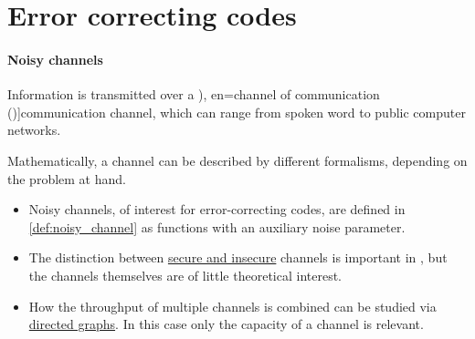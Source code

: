 \section{Error correcting codes}\label{sec:error_correcting_codes}

\paragraph{Noisy channels}

\begin{concept}\label{con:communication_channel}
  Information is transmitted over a \term[ru=канал связи (\cite[258]{Яблонский2003ДискретнаяМатематика}), en=channel of communication (\cite[879]{GowersEtAl2008PrincetonCompanion})]{communication channel}, which can range from spoken word to public computer networks.
\end{concept}
\begin{comments}
  \item Mathematically, a channel can be described by different formalisms, depending on the problem at hand.
  \begin{itemize}
    \item Noisy channels, of interest for error-correcting codes, are defined in \cref{def:noisy_channel} as functions with an auxiliary noise parameter.

    \item The distinction between \hyperref[con:privacy]{secure and insecure} channels is important in , but the channels themselves are of little theoretical interest.

    \item How the throughput of multiple channels is combined can be studied via \hyperref[def:directed_graph]{directed graphs}. In this case only the capacity of a channel is relevant.
  \end{itemize}
\end{comments}

